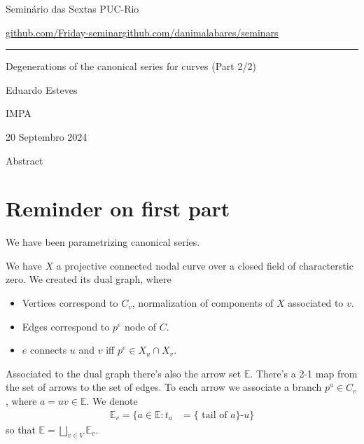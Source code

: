 


\begin{minipage}{\textwidth}
	\begin{minipage}{1\textwidth}
		Semin\'ario das Sextas \hfill PUC-Rio
		
		{\small\href{https://github.com/Friday-seminar/}{github.com/Friday-seminar}\hfill\href{https://github.com/danimalabares/seminars}{github.com/danimalabares/seminars}}
		\end{minipage}
\end{minipage}\vspace{.2cm}\hrule

\vspace{10pt}


{\Huge Degenerations of the canonical series for curves (Part 2/2)}

\hfill{\Large Eduardo Esteves}

\hfill{\Large IMPA}

\hfill{\large 20 Septembro 2024}

\begin{idea7}{Abstract}\leavevmode
	
\end{idea7}

\tableofcontents

\section{Reminder on first part}

We have been parametrizing canonical series.

We have $X$ a projective connected nodal curve over a closed field of characterstic zero. We created its dual graph, where
\begin{itemize}
\item Vertices correspond to $C_{v}$, normalization of components of $X$ associated to $v$.
\item Edges correspond to $p^e$ node of $C$.
\item $e$ connects $u$ and $v$ iff  $p^e\in X_u\cap X_v$.
\end{itemize}

Associated to the dual graph there's also the arrow set $\mathbb{E}$. There's a 2-1 map from the set of arrows to the set of edges. To each arrow we associate a branch $p^a \in C_v$, where $a=uv\in\mathbb{E}$. We denote
\begin{align*}
	\mathbb{E}_v=\{a\in \mathbb{E}:t_a&=\{\text{ tail of $a$}\}\text{-}u  \}
	\end{align*}
	so that $\mathbb{E}=\bigsqcup_{v \in V}\mathbb{E}_v$.

